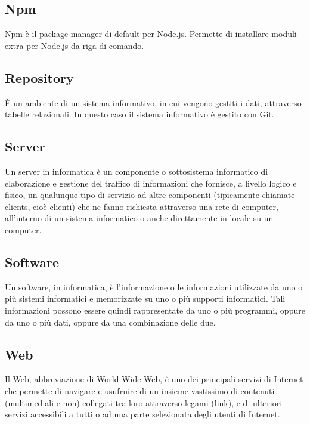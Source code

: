 \documentclass[a4paper, titlepage]{article}
\begin{document}
	\subsection{Npm}
	Npm è il package manager di default per Node.js. Permette di installare moduli extra per Node.js da riga di comando.
	
	\subsection{Repository}
	È un ambiente di un sistema informativo, in cui vengono gestiti i dati, attraverso tabelle relazionali. In questo caso il sistema informativo è gestito con Git.
	
	\subsection{Server}
	Un server in informatica è un componente o sottosistema informatico di elaborazione e gestione del traffico di informazioni che fornisce, a livello logico e fisico, un qualunque tipo di servizio ad altre componenti (tipicamente chiamate clients, cioè clienti) che ne fanno richiesta attraverso una rete di computer, all'interno di un sistema informatico o anche direttamente in locale su un computer.
	
	\subsection{Software}
	Un software, in informatica, è l’informazione o le informazioni utilizzate da uno o più sistemi informatici
	e memorizzate su uno o più supporti informatici. Tali informazioni possono essere quindi rappresentate da uno o più programmi, oppure da uno o più dati, oppure da una combinazione
	delle due.
	
	\subsection{Web}
	Il Web, abbreviazione di World Wide Web, è uno dei principali servizi di Internet che permette di
	navigare e usufruire di un insieme vastissimo di contenuti (multimediali e non) collegati tra loro
	attraverso legami (link), e di ulteriori servizi accessibili a tutti o ad una parte selezionata degli
	utenti di Internet.
	
\end{document}
